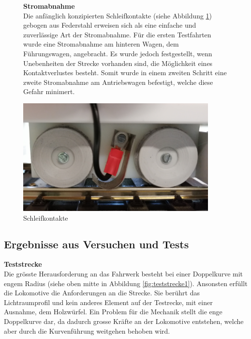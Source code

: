 \documentclass[../../main.tex]{subfiles}
\begin{document}
\begin{figure}[H]
  \begin{minipage}{.5\textwidth}
    \textbf{Stromabnahme}\\
    Die anfänglich konzipierten Schleifkontakte (siehe Abbildung \ref{fig:schleifkontakte}) gebogen aus Federstahl erweisen sich als eine einfache und zuverlässige Art der Stromabnahme. Für die ersten Testfahrten wurde eine Stromabnahme am hinteren Wagen, dem Führungswagen, angebracht. Es wurde jedoch festgestellt, wenn Unebenheiten der Strecke vorhanden sind, die Möglichkeit eines Kontaktverlustes besteht. Somit wurde in einem zweiten Schritt eine zweite Stromabnahme am Antriebswagen befestigt, welche diese Gefahr minimert.\\
   \end{minipage}
  \begin{minipage}{.5\textwidth}
    \flushright
    \includegraphics[width=0.9\textwidth]{schleifkontakt.PNG}
    \caption {Schleifkontakte}
    \label{fig:schleifkontakte}
    \end{minipage} 
\end{figure} 

\newpage

\subsection{Ergebnisse aus Versuchen und Tests}

\textbf{Teststrecke}\\
Die grösste Herausforderung an das Fahrwerk besteht bei einer Doppelkurve mit engem Radius (siehe oben mitte in Abbildung \ref{fig:teststrecke1}). Ansonsten erfüllt die Lokomotive die Anforderungen an die Strecke. Sie berührt das Lichtraumprofil und kein anderes Element auf der Testrecke, mit einer Ausnahme, dem Holzwürfel. Ein Problem für die Mechanik stellt die enge Doppelkurve dar, da dadurch grosse Kräfte an der Lokomotive entstehen, welche aber durch die Kurvenführung weitgehen behoben wird.\\
\end{document}
